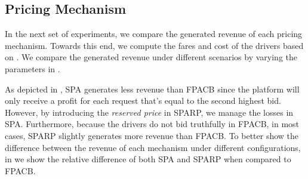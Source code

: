 \subsection{Pricing Mechanism}

In the next set of experiments, we compare the generated revenue of each pricing mechanism. Towards this end, we compute the fares and cost of the drivers based on . We compare the generated revenue under different scenarios by varying the parameters in .

As depicted in , SPA generates less revenue than FPACB since the platform will only receive a profit for each request that's equal to the second highest bid. However, by introducing the \emph{reserved price} in SPARP, we manage the losses in SPA. Furthermore, because the drivers do not bid truthfully in FPACB, in most cases, SPARP slightly generates more revenue than FPACB. To better show the difference between the revenue of each mechanism under different configurations, in  we show the relative difference of both SPA and SPARP when compared to FPACB. 

